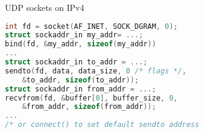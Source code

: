 \begin{frame}[fragile]{UDP sockets on IPv4}
\begin{lstlisting}[language=C++,style=smaller]
int fd = socket(AF_INET, SOCK_DGRAM, 0);
struct sockaddr_in my_addr= ...;
bind(fd, &my_addr, sizeof(my_addr))
...
struct sockaddr_in to_addr = ...;
sendto(fd, data, data_size, 0 /* flags */,
    &to_addr, sizeof(to_addr));
struct sockaddr_in from_addr = ...;
recvfrom(fd, &buffer[0], buffer_size, 0,
    &from_addr, sizeof(from_addr));
...
/* or connect() to set default sendto address
\end{lstlisting}
\end{frame}
